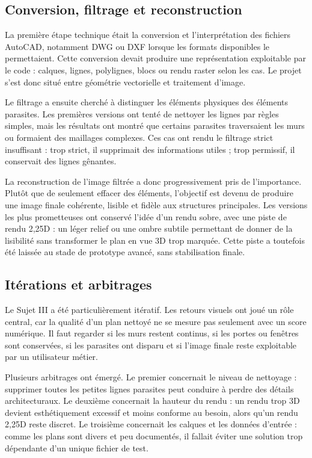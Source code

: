 \documentclass[12pt]{article}
\begin{document}
\subsection{Conversion, filtrage et reconstruction}

La première étape technique était la conversion et l’interprétation des fichiers AutoCAD, notamment DWG ou DXF lorsque les formats disponibles le permettaient. Cette conversion devait produire une représentation exploitable par le code : calques, lignes, polylignes, blocs ou rendu raster selon les cas. Le projet s’est donc situé entre géométrie vectorielle et traitement d’image. 

Le filtrage a ensuite cherché à distinguer les éléments physiques des élé\-ments parasites. Les premières versions ont tenté de nettoyer les lignes par règles simples, mais les résultats ont montré que certains parasites traversaient les murs ou formaient des maillages complexes. Ces cas ont rendu le filtrage strict insuffisant : trop strict, il supprimait des informations utiles ; trop permissif, il conservait des lignes gênantes. 

La reconstruction de l’image filtrée a donc progressivement pris de l’im\-portance. Plutôt que de seulement effacer des éléments, l’objectif est devenu de produire une image finale cohérente, lisible et fidèle aux structures principales. Les versions les plus prometteuses ont conservé l’idée d’un rendu sobre, avec une piste de rendu 2,25D : un léger relief ou une ombre subtile permettant de donner de la lisibilité sans transformer le plan en vue 3D trop marquée. Cette piste a toutefois été laissée au stade de prototype avancé, sans stabilisation finale. 

\subsection{Itérations et arbitrages}

Le Sujet III a été particulièrement itératif. Les retours visuels ont joué un rôle central, car la qualité d’un plan nettoyé ne se mesure pas seulement avec un score numérique. Il faut regarder si les murs restent continus, si les portes ou fenêtres sont conservées, si les parasites ont disparu et si l’image finale reste exploitable par un utilisateur métier. 

Plusieurs arbitrages ont émergé. Le premier concernait le niveau de nettoyage : supprimer toutes les petites lignes parasites peut conduire à perdre des détails architecturaux. Le deuxième concernait la hauteur du rendu : un rendu trop 3D devient esthétiquement excessif et moins conforme au besoin, alors qu’un rendu 2,25D reste discret. Le troisième concernait les calques et les données d’entrée : comme les plans sont divers et peu documentés, il fallait éviter une solution trop dépendante d’un unique fichier de test. 
\end{document}
